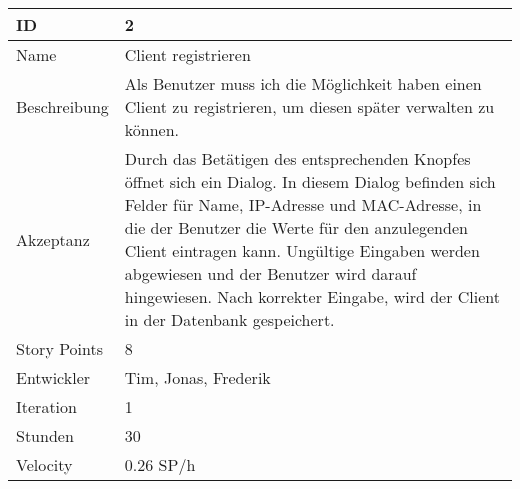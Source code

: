 \begin{table}[htbp]
    \begin{minipage}{\linewidth}
        \setlength{\tymax}{0.5\linewidth}
        \centering
        \small
        \begin{tabulary}{\textwidth}{|l|p{10cm}|} \hline
            ID   &2\\\hline
            Name  &Client registrieren\\\hline
            Beschreibung&Als Benutzer muss ich die Möglichkeit haben einen Client zu registrieren, um diesen später verwalten zu können.\\\hline
            Akzeptanz &Durch das Betätigen des entsprechenden Knopfes öffnet sich ein Dialog. In diesem Dialog befinden sich Felder für Name, IP-Adresse und MAC-Adresse, in die der Benutzer die Werte für den anzulegenden Client eintragen kann. Ungültige Eingaben werden abgewiesen und der Benutzer wird darauf hingewiesen. Nach korrekter Eingabe, wird der Client in der Datenbank gespeichert.\\\hline
            Story Points&8\\\hline
            Entwickler &Tim, Jonas, Frederik\\\hline
            Iteration &1\\\hline
            Stunden  &30\\\hline
            Velocity &0.26 SP\slash h\\\hline
        \end{tabulary}
    \end{minipage}
\end{table}



